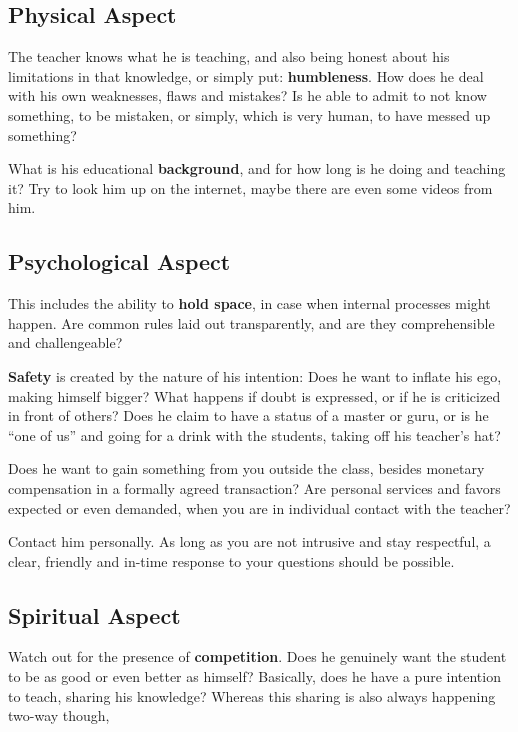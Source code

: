 \subsection{Physical Aspect}\label{subsec:physical-aspect}

The teacher knows what he is teaching, and also being honest about his limitations in that knowledge, or simply put: \textbf{humbleness}.
How does he deal with his own weaknesses, flaws and mistakes?
Is he able to admit to not know something, to be mistaken, or simply, which is very human, to have messed up something?

What is his educational \textbf{background}, and for how long is he doing and teaching it?
Try to look him up on the internet, maybe there are even some videos from him.

\subsection{Psychological Aspect}\label{subsec:psychological-aspect}

This includes the ability to \textbf{hold space}, in case when internal processes might happen.
Are common rules laid out transparently, and are they comprehensible and challengeable?

\textbf{Safety} is created by the nature of his intention: Does he want to inflate his ego, making himself bigger?
What happens if doubt is expressed, or if he is criticized in front of others?
Does he claim to have a status of a master or guru, or is he ``one of us'' and going for a drink with the students, taking off his teacher's hat?

Does he want to gain something from you outside the class, besides monetary compensation in a formally agreed transaction?
Are personal services and favors expected or even demanded, when you are in individual contact with the teacher?

Contact him personally.
As long as you are not intrusive and stay respectful, a clear, friendly and in-time response to your questions should be possible.

\subsection{Spiritual Aspect}\label{subsec:spiritual-aspect}

Watch out for the presence of \textbf{competition}.
Does he genuinely want the student to be as good or even better as himself?
Basically, does he have a pure intention to teach, sharing his knowledge? Whereas this sharing is also always happening two-way though,

